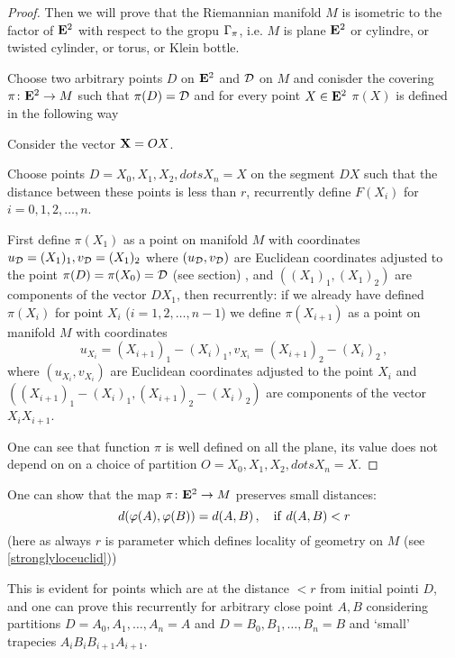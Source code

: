 \documentclass[12pt]{article}
\theoremstyle{theorem}
\theoremstyle{lemma}
\numberwithin{equation}{section}
\begin{document}
\begin{proof}

Then we will prove that the Riemannian manifold $M$ is isometric
to the factor of ${\bf E}^2$ with respect to the gropu ${\Gamma}_\pi$,
i.e. $M$ is  plane ${\bf E}^2$ or cylindre, or  twisted cylinder,
or torus, or Klein bottle.


Choose two arbitrary points $D$ on ${\bf E}^2$
and ${\cal D}$ on $M$ and conisder the covering 
$\pi\colon{\bf E}^2\to M$
such that $\pi(D)={\cal D}$ and for every point $X\in {\bf E}^2$
 $\pi(X)$ is defined in the following way
   
Consider the vector ${\bf X}=OX$.

Choose points $D=X_0,X_1,X_2,dots X_n=X$
on the segment  $DX$ such that 
the distance between these points is less than $r$,
recurrently  define $F(X_i)$ for $i=0,1,2,\dots,n$.

First define $\pi(X_1)$ as a point on manifold $M$
with coordinates $u_{\cal D}=(X_1)_1, v_{\cal D}=(X_1)_2$
where  $(u_{\cal D},v_{\cal D})$ are Euclidean coordinates
adjusted to the point $\pi(D)=\pi(X_0)={\cal D}$
(see section\label{localeuclidgeometry}) , and 
$\left((X_1)_1, (X_1)_2\right)$ are components
of the vector $DX_1$, then recurrently:
if we already have  defined $\pi(X_i)$ for point $X_i$
($i=1,2,\dots,n-1$)
we define $\pi(X_{i+1})$ as a point on manifold $M$
with coordinates 
          $$
 u_{X_i}=(X_{i+1})_1-(X_{i})_1, 
v_{X_i}=(X_{i+1})_2-(X_{i})_2\,,
              $$
where  $(u_{X_i},v_{X_i})$ are Euclidean coordinates
adjusted to the point $X_i$ and 
$\left((X_{i+1})_1-(X_{i})_1, (X_{i+1})_2-(X_{i})_2\right)$ 
are components
of the vector $X_i X_{i+1}$.

One can see that function $\pi$ is well defined
on all the plane, its value does not depend on
on a choice of partition 
$O=X_0,X_1,X_2,dots X_n=X$.
\end{proof}


One can show that the map $\pi\colon {\bf E}^2\to M$
preserves small distances:
                \begin{equation*}
        d(\varphi(A),\varphi(B))=d(A,B)\,,\quad
    {\rm if}\,\, d(A,B)<r
              \end{equation*}
(here as always $r$ is parameter which defines locality
of geometry on $M$ (see \eqref{stronglyloceuclid}))

This is evident for points which are at the distance
$<r$ from initial pointi $D$, and one can prove this recurrently
for arbitrary close point $A,B$ considering partitions
  $D=A_0,A_1,\dots,A_n=A$ and
  $D=B_0,B_1,\dots,B_n=B$  and `small' trapecies
 $A_iB_iB_{i+1}A_{i+1}$. 
\end{document}
